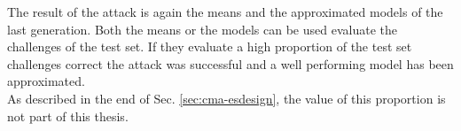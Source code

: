 The result of the attack is again the means and the approximated models of the last generation.
Both the means or the models can be used evaluate the challenges of the test set. 
If they evaluate a high proportion of the test set challenges correct the attack was successful and a well performing model has been approximated.\\
As described in the end of Sec. \ref{sec:cma-esdesign}, the value of this proportion is not part of this thesis.










